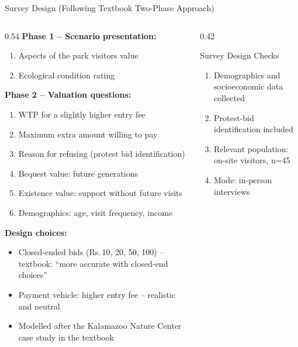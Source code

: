 \documentclass[10pt, aspectratio=169]{beamer}
\newcommand{\rupee}{\textrm{Rs.}\,}
\begin{document}
\begin{frame}[shrink=5]{Survey Design (Following Textbook Two-Phase Approach)}
    \begin{columns}[T]
        \begin{column}{0.54\textwidth}
            \textbf{Phase 1 -- Scenario presentation:}
            \begin{enumerate}
                \small
                \item Aspects of the park visitors value
                \item Ecological condition rating
            \end{enumerate}

            \vspace{0.2em}
            \textbf{Phase 2 -- Valuation questions:}
            \begin{enumerate}
                \small
                \setcounter{enumi}{2}
                \item WTP for a slightly higher entry fee
                \item Maximum extra amount willing to pay
                \item Reason for refusing (protest bid identification)
                \item Bequest value: future generations
                \item Existence value: support without future visits
                \item Demographics: age, visit frequency, income
            \end{enumerate}

            \vspace{0.2em}
            \textbf{Design choices:}
            \begin{itemize}
                \scriptsize
                \item Closed-ended bids (\rupee 10, 20, 50, 100) -- textbook: ``more accurate with closed-end choices''
                \item Payment vehicle: higher entry fee -- realistic and neutral
                \item Modelled after the Kalamazoo Nature Center case study in the textbook
            \end{itemize}
        \end{column}
        \begin{column}{0.42\textwidth}
            \begin{block}{Survey Design Checks}
                \scriptsize
                \begin{enumerate}
                    \item Demographics and socioeconomic data collected
                    \item Protest-bid identification included
                    \item Relevant population: on-site visitors, n=45
                    \item Mode: in-person interviews
                \end{enumerate}
            \end{block}


\end{column}
\end{columns}
\end{frame}
\end{document}
